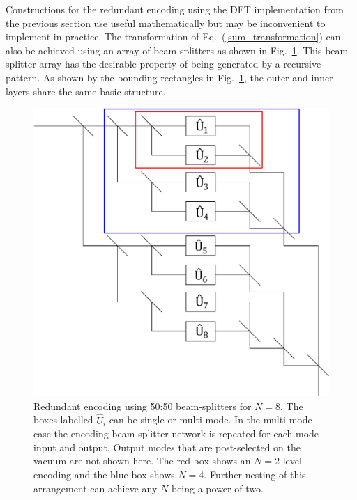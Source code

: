 \documentclass[aps,pra,twocolumn,superscriptaddress,numerical,floatfix]{revtex4-1}
\begin{document}
Constructions for the redundant encoding using the DFT implementation from the previous section use useful mathematically but may be inconvenient to implement in practice.  The transformation of Eq.~(\ref{sum_transformation}) can also be achieved using an array of beam-splitters as shown in Fig.~\ref{fig:gen system}.  This beam-splitter array has the desirable property of being generated by a recursive pattern.  As shown by the bounding rectangles in Fig.~\ref{fig:gen system}, the outer and inner layers share the same basic structure. 

\begin{figure}[tbh]
	\includegraphics[width=\columnwidth]{unitaries.pdf}
	\caption{\label{fig:gen system}Redundant encoding using 50:50 beam-splitters for $N=8$. The boxes labelled $\hat{U}_i$ can be single or multi-mode.  In the multi-mode case the encoding beam-splitter network is repeated for each mode input and output. Output modes that are post-selected on the vacuum are not shown here. The red box shows an $N=2$ level encoding and the blue box shows $N=4$.  Further nesting of this arrangement can achieve any $N$ being a power of two.}
\end{figure}
	
	
\end{document}
